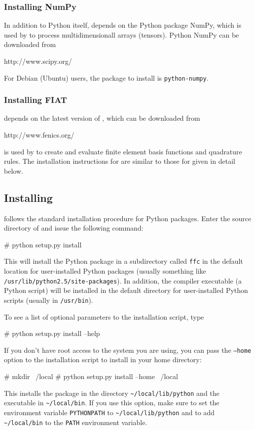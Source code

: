 \subsubsection{Installing NumPy}

In addition to Python itself, \ffc{} depends on the Python package NumPy,
which is used by \ffc{} to process multidimensionall arrays (tensors).
Python NumPy can be downloaded from
\begin{code}
http://www.scipy.org/
\end{code}
For Debian (Ubuntu) users, the package to install is \texttt{python-numpy}.

\subsubsection{Installing FIAT}

\ffc{} depends on the latest version of \fiat{}, which can be
downloaded from
\begin{code}
http://www.fenics.org/
\end{code}
\fiat{} is used by \ffc{} to create and evaluate finite element basis
functions and quadrature rules.
The installation instructions for \fiat{} are similar to those for
\ffc{} given in detail below.



\subsection{Installing \ffc{}}

\ffc{} follows the standard installation procedure for Python
packages. Enter the source directory of \ffc{} and issue the
following command:
\begin{code}
# python setup.py install
\end{code}
This will install the \ffc{} Python package in a subdirectory
called \texttt{ffc} in the default location for user-installed Python
packages (usually something like \texttt{/usr/lib/python2.5/site-packages}).
In addition, the compiler executable (a Python script) will be
installed in the default directory for user-installed Python scripts
(usually in \texttt{/usr/bin}).

To see a list of optional parameters to the installation script, type
\begin{code}
# python setup.py install --help
\end{code}
If you don't have root access to the system you are using, you can
pass the \texttt{--home} option to the installation script to install
\ffc{} in your home directory:
\begin{code}
# mkdir ~/local
# python setup.py install --home ~/local
\end{code}
This installs the \ffc{} package in the directory \texttt{\~{}/local/lib/python}
and the \ffc{} executable in \texttt{\~{}/local/bin}. If you use this
option, make sure to set the environment variable \texttt{PYTHONPATH}
to \texttt{\~{}/local/lib/python} and to add \texttt{\~{}/local/bin}
to the \texttt{PATH} environment variable.

